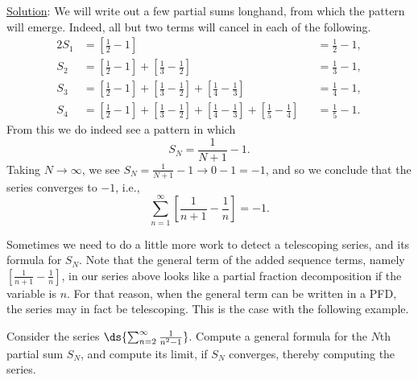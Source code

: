 \underline{Solution}: We will write out a few partial sums longhand, 
from which the pattern will emerge.
Indeed, all but two terms will cancel in each of the following.
\begin{alignat*}{2}
S_1&=\left[\frac12-1\right]&&=\frac12-1,\\
S_2&=\left[\frac12-1\right]+\left[\frac13-\frac12\right]
     &&=\frac13-1,\\
S_3&=\left[\frac12-1\right]+\left[\frac13-\frac12\right]
   +\left[\frac14-\frac13\right]&&=\frac14-1,\\
S_4&=\left[\frac12-1\right]+\left[\frac13-\frac12\right]
   +\left[\frac14-\frac13\right]+\left[\frac15-\frac14\right]
   &&=\frac15-1.
\end{alignat*}
From this we do indeed see a pattern in which 
$$S_N=\frac1{N+1}-1.$$
Taking $N\to\infty$, we see $S_N=\frac1{N+1}-1\longrightarrow0-1=-1$,
and so we conclude that the series converges to $-1$, i.e.,
$$\sum_{n=1}^\infty\left[\frac1{n+1}-\frac1n\right]=-1.$$
\eex

Sometimes we need to do a little more work to detect a
telescoping series, and its formula for $S_N$.
Note that the general term of the added sequence terms,
namely $\left[\frac1{n+1}-\frac1n\right]$,
in our series above looks like a partial fraction decomposition
if the variable is $n$.  For that reason, when
the general term can be written in a PFD, the series may 
in fact be telescoping.  This is the case with the following 
example. 

\bex Consider the series $\ds{\sum_{n=2}^\infty\frac1{n^2-1}}$.
Compute a general formula for the $N$th partial sum $S_N$,
and compute its limit, if $S_N$ converges, thereby computing the series.

